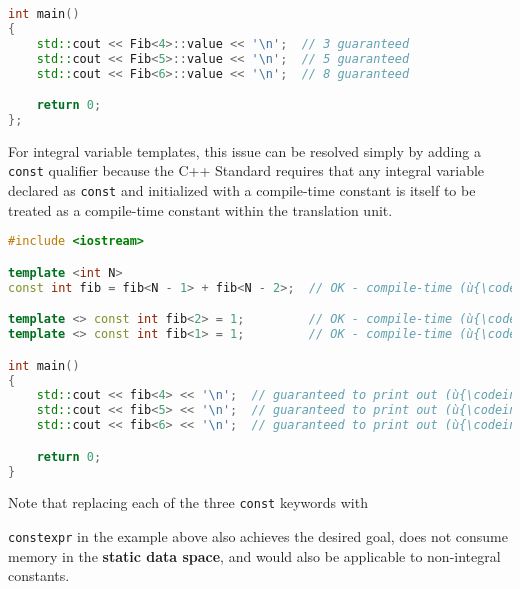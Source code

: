 {\begin{lstlisting}[language=C++]
int main()
{
    std::cout << Fib<4>::value << '\n';  // 3 guaranteed
    std::cout << Fib<5>::value << '\n';  // 5 guaranteed
    std::cout << Fib<6>::value << '\n';  // 8 guaranteed

    return 0;
};
\end{lstlisting}

\noindent For integral variable templates, this issue can be resolved simply by adding a \lstinline!const! qualifier because the C++ Standard requires that any integral variable declared as \lstinline!const! and initialized with a compile-time constant is itself to be treated as a compile-time constant within the translation unit.

\begin{lstlisting}[language=C++]
#include <iostream>

template <int N>
const int fib = fib<N - 1> + fib<N - 2>;  // OK - compile-time (ù{\codeincomments{const}}ù).

template <> const int fib<2> = 1;         // OK - compile-time (ù{\codeincomments{const}}ù).
template <> const int fib<1> = 1;         // OK - compile-time (ù{\codeincomments{const}}ù).

int main()
{
    std::cout << fib<4> << '\n';  // guaranteed to print out (ù{\codeincomments{3}}ù)
    std::cout << fib<5> << '\n';  // guaranteed to print out (ù{\codeincomments{5}}ù)
    std::cout << fib<6> << '\n';  // guaranteed to print out (ù{\codeincomments{8}}ù)

    return 0;
}
\end{lstlisting}

\noindent Note that replacing each of the three \texttt{const} keywords with
{\texttt{constexpr} in the example above also achieves the
desired goal, does not consume memory in the \textbf{static data
space}, and would also be applicable to non-integral constants.

}}
